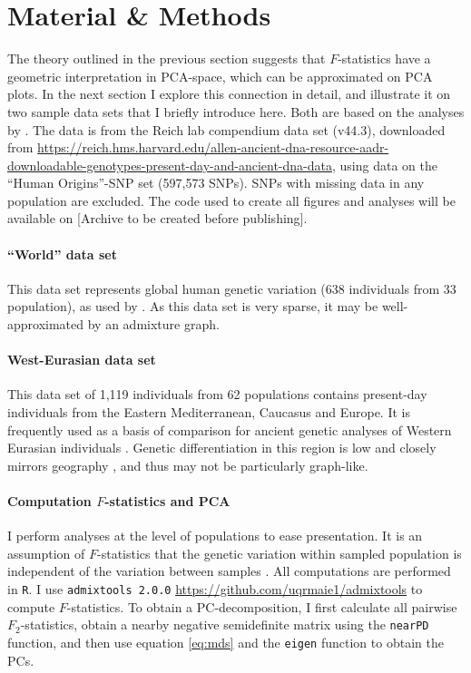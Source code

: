 \documentclass[12pt,fullpage, a4paper]{article}
\begin{document}
\section{Material \& Methods}
The theory outlined in the previous section suggests that $F$-statistics have a geometric interpretation in PCA-space, which can be approximated on PCA plots. In the next section I explore this connection in detail, and illustrate it on two sample data sets that I briefly introduce here. Both are based on the analyses by \cite{lazaridis2014}. The data is from the Reich lab compendium data set (v44.3), downloaded from \url{https://reich.hms.harvard.edu/allen-ancient-dna-resource-aadr-downloadable-genotypes-present-day-and-ancient-dna-data}, using data on the ``Human Origins''-SNP set (597,573 SNPs). SNPs with missing data in any population are excluded. The code used to create all figures and analyses will be available on [Archive to be created before publishing].

\paragraph{``World'' data set}
This data set represents global human genetic variation (638 individuals from 33 population), as used by \citep{lazaridis2014}. As this data set is very sparse, it may be well-approximated by an admixture graph.


\paragraph{West-Eurasian data set}
This data set of 1,119 individuals from 62 populations contains  present-day individuals from the Eastern Mediterranean, Caucasus and Europe. It is frequently used as a basis of comparison for ancient genetic analyses of Western Eurasian individuals \citep{patterson2012, lazaridis2014}. Genetic differentiation in this region is low and closely mirrors geography \citep{novembre2008}, and thus may not be particularly graph-like.


\paragraph{Computation $F$-statistics and PCA}
I perform analyses at the level of populations to ease presentation.  It is an assumption of $F$-statistics that the genetic variation within sampled population is independent of the variation between samples \citep{patterson2012}. All computations are performed in \texttt{R}. I use \texttt{admixtools 2.0.0} \url{https://github.com/uqrmaie1/admixtools} to compute $F$-statistics. To obtain a PC-decomposition, I first calculate all pairwise $F_2$-statistics, obtain a nearby negative semidefinite matrix using the \texttt{nearPD} function, and then use equation \ref{eq:mds} and the \texttt{eigen} function to obtain the PCs. 
\end{document}
